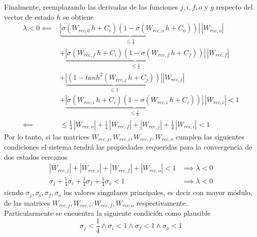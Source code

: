 \documentclass{article}
\begin{document}
\begin{appendices}
\begin{equation*}
		\end{equation*}
		Finalmente, reemplazando las derivadas de las funciones $j, i, f, o$ y $g$ respecto del vector de estado $h$ se obtiene
		\begin{equation*}
		\begin{split}
		\lambda < 0 \impliedby & \underbrace{|\sigma(W_{rec,0} \, h + C_i) (1-\sigma(W_{rec,o} \, h + C_o)) |}_{\le \frac{1}{4}} \, |W_{rec,o}| \\
		&+ \underbrace{|\sigma(W_{rec,f} \, h + C_i) (1-\sigma(W_{rec,f} \, h + C_f)) |}_{\le \frac{1}{4}} \, |W_{rec,f}| \\
		&+ \underbrace{|(1- tanh^2(W_{rec,j} \, h + C_j))|}_{\le 1} |W_{rec,j}| \\
		&+ \underbrace{|\sigma(W_{rec,i} \, h + C_i) (1-\sigma(W_{rec,i} \, h + C_i)) |}_{\le \frac{1}{4}} \, |W_{rec,i}| < 1\\
		\impliedby & \le \frac{1}{4} \, |W_{rec,o}| + \frac{1}{4} \, |W_{rec,f}| + |W_{rec,j}| + \frac{1}{4} \, |W_{rec,i}| < 1
		\end{split}
		\end{equation*}
		Por lo tanto, si las matrices $W_{rec,j}, W_{rec,i}, W_{rec,f}, W_{rec,o}$ cumplen las siguientes condiciones el sistema tendrá las propiedades requeridas para la convergencia de dos estados cercanos
		\begin{equation*}
		\begin{split}
		|W_{rec,j}| + |W_{rec,i}| + |W_{rec,f}| + |W_{rec,o}| < 1 &\implies \lambda < 0\\
		\sigma_j + \frac{1}{4} \sigma_i + \frac{1}{4} \sigma_f + \frac{1}{4} \sigma_o < 1 &\implies \lambda < 0
		\end{split}
		\end{equation*}
		siendo $\sigma_j , \sigma_i , \sigma_f , \sigma_o $ los valores singulares principales, es decir con mayor módulo, de las matrices $W_{rec,j}, W_{rec,i}, W_{rec,f}, W_{rec,o}$ respectivamente.\\ 
		
		Particularmente se encuentra la siguiente condición como plausible 
		\begin{equation*}
		\sigma_j < \frac{1}{4} \land \sigma_i < 1 \land \sigma_f < 1 \land \sigma_o < 1
		\end{equation*}
		
	\end{appendices}
	
	\pagebreak
	
	
	\printbibliography[title=Bibliografía]
	
	
	
\end{document}

